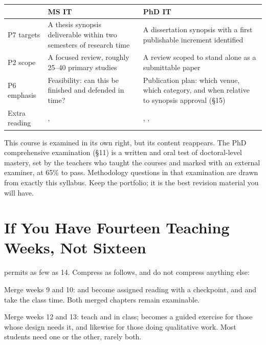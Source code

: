 \begin{center}
\small
\begin{tabular}{@{}L{3.4cm}L{5.8cm}L{5.8cm}@{}}
\toprule
 & \textbf{MS IT} & \textbf{PhD IT} \\
\midrule
P7 targets
  & A thesis synopsis deliverable within two semesters of research time
  & A dissertation synopsis with a first publishable increment identified \\
P2 scope
  & A focused review, roughly 25--40 primary studies
  & A review scoped to stand alone as a submittable paper \\
P6 emphasis
  & Feasibility: can this be finished and defended in time?
  & Publication plan: which venue, which category, and when relative to
    synopsis approval (\S15) \\
Extra reading
  & , 
  & , ,  \\
\bottomrule
\end{tabular}
\end{center}

\begin{conceptbox}
This course is examined in its own right, but its content reappears. The PhD
comprehensive examination (\S11) is a written and oral test of doctoral-level
mastery, set by the teachers who taught the courses and marked with an external
examiner, at 65\% to pass. Methodology questions in that examination are drawn
from exactly this syllabus. Keep the portfolio; it is the best revision
material you will have.
\end{conceptbox}

\section{If You Have Fourteen Teaching Weeks, Not Sixteen}

 permits as few as 14. Compress as follows, and do not
compress anything else:

\begin{tight}
  \item Merge weeks 9 and 10:  and  become
    assigned reading with a checkpoint, and  and
     take the class time. Both merged chapters remain
    examinable.
  \item Merge weeks 12 and 13: teach  and  in
    class;  becomes a guided exercise for those whose design needs
    it, and  likewise for those doing qualitative work. Most
    students need one or the other, rarely both.
\end{tight}

